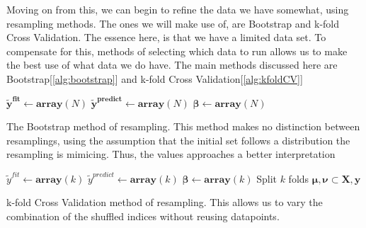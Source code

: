 \documentclass[12pt]{revtex4-2}
\begin{document}
Moving on from this, we can begin to refine the data we have somewhat, using resampling 
methods. The ones we will make use of, are Bootstrap and k-fold Cross Validation. 
The essence here, is that we have a limited data set. To compensate for this, methods of
selecting which data to run allows us to make the best use of what data we do have. 
The main methods discussed here are Bootstrap[\ref{alg:bootstrap}] and k-fold Cross 
Validation[\ref{alg:kfoldCV}]

\begin{algorithm}
	\DontPrintSemicolon
	$\bm{\tilde{y}^{fit}} \gets \mathbf{array}(N)$\;
	$\bm{\tilde{y}^{predict}} \gets \mathbf{array}(N)$\;
	$\bm{\beta} \gets \mathbf{array}(N)$\;
	\caption{The Bootstrap method of resampling. This method makes no distinction
	between resamplings, using the assumption that the initial set follows a 
	distribution the resampling is mimicing. Thus, the values approaches a better 
	interpretation}
	\label{alg:bootstrap}
\end{algorithm}

\begin{algorithm}
	\DontPrintSemicolon
	$\tilde{y}^{fit} \gets \mathbf{array}(k)$\;
	$\tilde{y}^{predict} \gets \mathbf{array}(k)$\;
	$\bm{\beta} \gets \mathbf{array}(k)$\;
	Split $k$ folds $\bm{\mu}, \bm{\nu} \subset \bm{X}, \bm{y}$\;
	\caption{k-fold Cross Validation method of resampling. This allows us to vary the 
	combination of the shuffled indices without reusing datapoints.}
	\label{alg:kfoldCV}
\end{algorithm}
\end{document}
